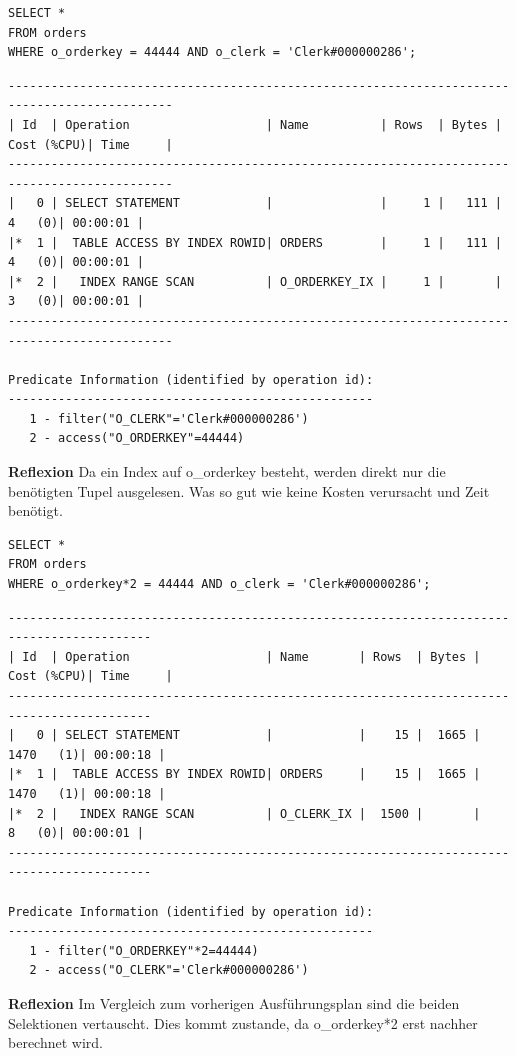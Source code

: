 \documentclass[10pt]{article}
\begin{document}
\begin{lstlisting}[style=sql]
SELECT *
FROM orders
WHERE o_orderkey = 44444 AND o_clerk = 'Clerk#000000286';
\end{lstlisting}
\begin{lstlisting}[style=queryexecutionplan]
---------------------------------------------------------------------------------------------
| Id  | Operation                   | Name          | Rows  | Bytes | Cost (%CPU)| Time     |
---------------------------------------------------------------------------------------------
|   0 | SELECT STATEMENT            |               |     1 |   111 |     4   (0)| 00:00:01 |
|*  1 |  TABLE ACCESS BY INDEX ROWID| ORDERS        |     1 |   111 |     4   (0)| 00:00:01 |
|*  2 |   INDEX RANGE SCAN          | O_ORDERKEY_IX |     1 |       |     3   (0)| 00:00:01 |
---------------------------------------------------------------------------------------------

Predicate Information (identified by operation id):
---------------------------------------------------
   1 - filter("O_CLERK"='Clerk#000000286')
   2 - access("O_ORDERKEY"=44444)
\end{lstlisting}
\textbf{Reflexion} \newline
Da ein Index auf o\_orderkey besteht, werden direkt nur die benötigten Tupel ausgelesen. Was so 
gut wie keine Kosten verursacht und Zeit benötigt.

\begin{lstlisting}[style=sql]
SELECT *
FROM orders
WHERE o_orderkey*2 = 44444 AND o_clerk = 'Clerk#000000286';
\end{lstlisting}
\begin{lstlisting}[style=queryexecutionplan]
------------------------------------------------------------------------------------------
| Id  | Operation                   | Name       | Rows  | Bytes | Cost (%CPU)| Time     |
------------------------------------------------------------------------------------------
|   0 | SELECT STATEMENT            |            |    15 |  1665 |  1470   (1)| 00:00:18 |
|*  1 |  TABLE ACCESS BY INDEX ROWID| ORDERS     |    15 |  1665 |  1470   (1)| 00:00:18 |
|*  2 |   INDEX RANGE SCAN          | O_CLERK_IX |  1500 |       |     8   (0)| 00:00:01 |
------------------------------------------------------------------------------------------

Predicate Information (identified by operation id):
---------------------------------------------------
   1 - filter("O_ORDERKEY"*2=44444)
   2 - access("O_CLERK"='Clerk#000000286')
\end{lstlisting}
\textbf{Reflexion} \newline
Im Vergleich zum vorherigen Ausführungsplan sind die beiden Selektionen vertauscht. Dies kommt zustande, 
da o\_orderkey*2 erst nachher berechnet wird.
\end{document}
